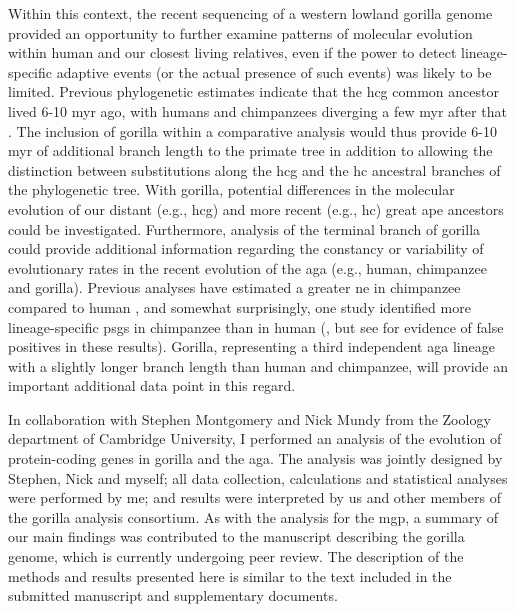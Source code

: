 Within this context, the recent sequencing of a western lowland
gorilla genome provided an opportunity to further examine patterns of
molecular evolution within human and our closest living relatives,
even if the power to detect lineage-specific adaptive events (or the
actual presence of such events) was likely to be limited. Previous
phylogenetic estimates indicate that the \ac{hcg} common ancestor
lived 6-10 \ac{myr} ago, with humans and chimpanzees diverging a few
\ac{myr} after that \citep{Bradley2008}. The inclusion of gorilla
within a comparative analysis would thus provide 6-10 \ac{myr} of
additional branch length to the primate tree in addition to allowing
the distinction between substitutions along the \ac{hcg} and the
\ac{hc} ancestral branches of the phylogenetic tree. With gorilla,
potential differences in the molecular evolution of our distant (e.g.,
\ac{hcg}) and more recent (e.g., \ac{hc}) great ape ancestors could be
investigated. Furthermore, analysis of the terminal branch of gorilla
could provide additional information regarding the constancy or
variability of evolutionary rates in the recent evolution of the
\ac{aga} (e.g., human, chimpanzee and gorilla). Previous analyses have
estimated a greater \ac{ne} in chimpanzee compared to human
\citep{Sequencing2005a,Siepel2009a}, and somewhat surprisingly, one
study identified more lineage-specific \acp{psg} in chimpanzee than in
human (\citet{Bakewell2007}, but see \citet{Mallick2009} for evidence
of false positives in these results). Gorilla, representing a third
independent \ac{aga} lineage with a slightly longer branch length than
human and chimpanzee, will provide an important additional data point
in this regard.

In collaboration with Stephen Montgomery and Nick Mundy from the
Zoology department of Cambridge University, I performed an analysis of
the evolution of protein-coding genes in gorilla and the \ac{aga}. The
analysis was jointly designed by Stephen, Nick and myself; all data
collection, calculations and statistical analyses were performed by
me; and results were interpreted by us and other members of the
gorilla analysis consortium. As with the analysis for the \ac{mgp}, a
summary of our main findings was contributed to the manuscript
describing the gorilla genome, which is currently undergoing peer
review. The description of the methods and results presented here is
similar to the text included in the submitted manuscript and
supplementary documents.

